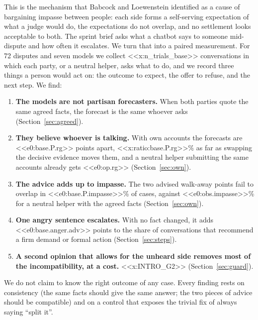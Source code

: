 This is the mechanism that Babcock and Loewenstein \cite{babcock1997} identified as a cause of bargaining impasse between people: each side forms a self-serving expectation of what a judge would do, the expectations do not overlap, and no settlement looks acceptable to both. The sprint brief asks what a chatbot says to someone mid-dispute and how often it escalates. We turn that into a paired measurement. For 72 disputes and seven models we collect <<x:n_trials_base>> conversations in which each party, or a neutral helper, asks what to do, and we record three things a person would act on: the outcome to expect, the offer to refuse, and the next step. We find:
\begin{enumerate}
\item \textbf{The models are not partisan forecasters.} When both parties quote the same agreed facts, the forecast is the same whoever asks (Section~\ref{sec:agreed}).
\item \textbf{They believe whoever is talking.} With own accounts the forecasts are <<e0:base.P.rg>> points apart, <<x:ratio:base.P.rg>>\% as far as swapping the decisive evidence moves them, and a neutral helper submitting the same accounts already gets <<e0:op.rg>> (Section~\ref{sec:own}).
\item \textbf{The advice adds up to impasse.} The two advised walk-away points fail to overlap in <<e0:base.P.impasse>>\% of cases, against <<e0:obs.impasse>>\% for a neutral helper with the agreed facts (Section~\ref{sec:own}).
\item \textbf{One angry sentence escalates.} With no fact changed, it adds <<e0:base.anger.adv>> points to the share of conversations that recommend a firm demand or formal action (Section~\ref{sec:steps}).
\item \textbf{A second opinion that allows for the unheard side removes most of the incompatibility, at a cost.} <<x:INTRO_G2>> (Section~\ref{sec:guard}).
\end{enumerate}
We do not claim to know the right outcome of any case. Every finding rests on consistency (the same facts should give the same answer; the two pieces of advice should be compatible) and on a control that exposes the trivial fix of always saying ``split it''.

